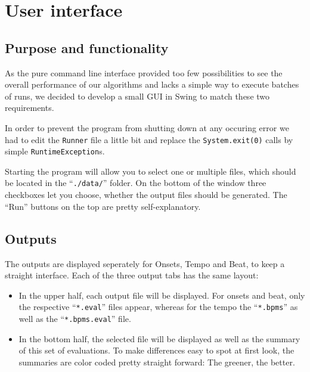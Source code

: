 \chapter{User interface} \label{cpt:gui}

\section{Purpose and functionality}
As the pure command line interface provided too few possibilities to see the
overall performance of our algorithms and lacks a simple way to execute
batches of runs, we decided to develop a small GUI in Swing to match these two
requirements.

In order to prevent the program from shutting down at any occuring error we had
to edit the \texttt{Runner} file a little bit and replace the
\texttt{System.exit(0)} calls by simple \texttt{RuntimeException}s.

Starting the program will allow you to select one or multiple files, which
should be located in the ``\texttt{./data/}'' folder. On the bottom of the
window three checkboxes let you choose, whether the output files should be
generated. The ``Run'' buttons on the top are pretty self-explanatory.

\section{Outputs}
The outputs are displayed seperately for Onsets, Tempo and Beat, to keep a
straight interface. Each of the three output tabs has the same layout:

\begin{itemize}
  \item In the upper half, each output file will be displayed. For onsets and
  beat, only the respective ``\texttt{*.eval}'' files appear, whereas for the
  tempo the ``\texttt{*.bpms}'' as well as the ``\texttt{*.bpms.eval}'' file.
  \item In the bottom half, the selected file will be displayed as well as the
  summary of this set of evaluations. To make differences easy to spot at first
  look, the summaries are color coded pretty straight forward: The greener, the
  better.
\end{itemize}

